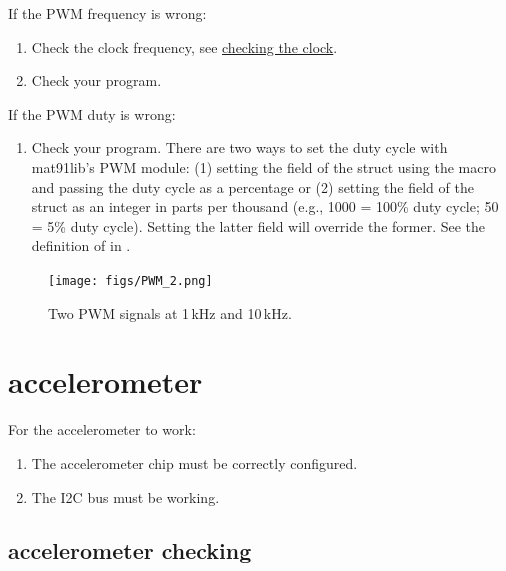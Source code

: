 If the PWM frequency is wrong:

\begin{enumerate}
\item
  Check the clock frequency, see
  \hyperref[checking-the-clock]{checking the clock}.
\item
  Check your program.
\end{enumerate}

If the PWM duty is wrong:

\begin{enumerate}
\item
  Check your program. There are two ways to set the duty cycle with
  mat91lib's PWM module: (1) setting the  field of the
   struct using the  macro and
  passing the duty cycle as a percentage or (2) setting the
   field of the  struct as an integer
  in parts per thousand (e.g., 1000 = 100\% duty cycle; 50 = 5\% duty
  cycle). Setting the latter field will override the former. See the
  definition of  in .
\end{enumerate}

\begin{figure}[!h]
\centering
\texttt{[image: figs/PWM\_2.png]}
\caption{Two PWM signals at 1\,kHz and 10\,kHz.}
\end{figure}


\section{accelerometer}
\label{accelerometer}

For the accelerometer to work:
%
\begin{enumerate}
\item The accelerometer chip must be correctly configured.
\item The I2C bus must be working.
\end{enumerate}


\subsection{accelerometer checking}
\label{checking-accelerometer}

